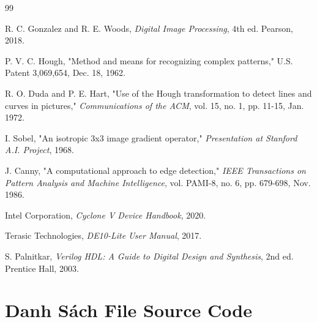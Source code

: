 \documentclass[12pt,a4paper]{report}
\begin{document}
\begin{thebibliography}{99}

R. C. Gonzalez and R. E. Woods, \textit{Digital Image Processing}, 4th ed. Pearson, 2018.

P. V. C. Hough, "Method and means for recognizing complex patterns," U.S. Patent 3,069,654, Dec. 18, 1962.

R. O. Duda and P. E. Hart, "Use of the Hough transformation to detect lines and curves in pictures," \textit{Communications of the ACM}, vol. 15, no. 1, pp. 11-15, Jan. 1972.

I. Sobel, "An isotropic 3x3 image gradient operator," \textit{Presentation at Stanford A.I. Project}, 1968.

J. Canny, "A computational approach to edge detection," \textit{IEEE Transactions on Pattern Analysis and Machine Intelligence}, vol. PAMI-8, no. 6, pp. 679-698, Nov. 1986.

Intel Corporation, \textit{Cyclone V Device Handbook}, 2020.

Terasic Technologies, \textit{DE10-Lite User Manual}, 2017.

S. Palnitkar, \textit{Verilog HDL: A Guide to Digital Design and Synthesis}, 2nd ed. Prentice Hall, 2003.

\end{thebibliography}

\appendix

\chapter{Danh Sách File Source Code}
\end{document}
